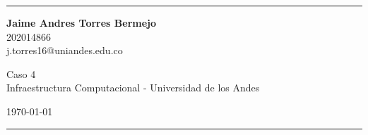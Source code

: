 \documentclass[a4paper]{article}
\begin{document}

\fancyhead[C]{}
\hrule \medskip %
\begin{minipage}{0.295\textwidth} 
\raggedright
\footnotesize
\textbf{Jaime Andres Torres Bermejo} \hfill\\   
202014866\hfill\\
j.torres16@uniandes.edu.co


\end{minipage}
\begin{minipage}{0.4\textwidth} 
\centering 
\large 
Caso 4\\ 
\normalsize 
Infraestructura Computacional - Universidad de los Andes\\ 
\end{minipage}
\begin{minipage}{0.295\textwidth} 
\raggedleft
\today\hfill\\
\end{minipage}
\medskip\hrule 
\bigskip



\end{document}
